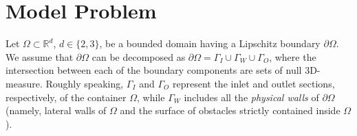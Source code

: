 \documentclass[10pt,a4paper]{article}
\begin{document}
\section{Model Problem}\label{section1}
Let $\Omega \subset \mathbb{R}^d$, $d \in \{2,3\}$, be a bounded domain having a Lipschitz boundary $\partial \Omega$. We assume that $\partial \Omega$ can be decomposed as $\partial \Omega = \Gamma_{I} \cup \Gamma_{W} \cup \Gamma_{O}$, where the intersection between each of the boundary components are sets of null 3D-measure. Roughly speaking, $\Gamma_{I}$ and $\Gamma_{O}$ represent the inlet and outlet sections, respectively, of the container $\Omega$, while $\Gamma_{W}$ includes all the \textit{physical walls} of $\partial \Omega$ (namely, lateral walls of $\Omega$ and the surface of obstacles strictly contained inside $\Omega$).
\end{document}
